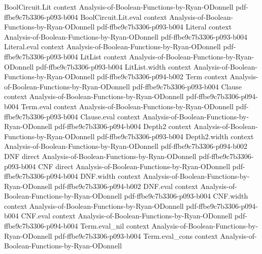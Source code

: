 \begin{lemma}
\label{LMN.varWeight_compose_sum}
\leanok
{}
\proofstep
  {BoolCircuit.Lit}
  {context}
  {Analysis-of-Boolean-Functions-by-Ryan-ODonnell}
  {pdf-ffbe9c7b3306-p093-b004}
\proofstep
  {BoolCircuit.Lit.eval}
  {context}
  {Analysis-of-Boolean-Functions-by-Ryan-ODonnell}
  {pdf-ffbe9c7b3306-p093-b004}
\proofstep
  {Literal}
  {context}
  {Analysis-of-Boolean-Functions-by-Ryan-ODonnell}
  {pdf-ffbe9c7b3306-p093-b004}
\proofstep
  {Literal.eval}
  {context}
  {Analysis-of-Boolean-Functions-by-Ryan-ODonnell}
  {pdf-ffbe9c7b3306-p093-b004}
\proofstep
  {LitList}
  {context}
  {Analysis-of-Boolean-Functions-by-Ryan-ODonnell}
  {pdf-ffbe9c7b3306-p093-b004}
\proofstep
  {LitList.width}
  {context}
  {Analysis-of-Boolean-Functions-by-Ryan-ODonnell}
  {pdf-ffbe9c7b3306-p094-b002}
\proofstep
  {Term}
  {context}
  {Analysis-of-Boolean-Functions-by-Ryan-ODonnell}
  {pdf-ffbe9c7b3306-p093-b004}
\proofstep
  {Clause}
  {context}
  {Analysis-of-Boolean-Functions-by-Ryan-ODonnell}
  {pdf-ffbe9c7b3306-p094-b004}
\proofstep
  {Term.eval}
  {context}
  {Analysis-of-Boolean-Functions-by-Ryan-ODonnell}
  {pdf-ffbe9c7b3306-p093-b004}
\proofstep
  {Clause.eval}
  {context}
  {Analysis-of-Boolean-Functions-by-Ryan-ODonnell}
  {pdf-ffbe9c7b3306-p094-b004}
\proofstep
  {Depth2}
  {context}
  {Analysis-of-Boolean-Functions-by-Ryan-ODonnell}
  {pdf-ffbe9c7b3306-p093-b004}
\proofstep
  {Depth2.width}
  {context}
  {Analysis-of-Boolean-Functions-by-Ryan-ODonnell}
  {pdf-ffbe9c7b3306-p094-b002}
\proofstep
  {DNF}
  {direct}
  {Analysis-of-Boolean-Functions-by-Ryan-ODonnell}
  {pdf-ffbe9c7b3306-p093-b004}
\proofstep
  {CNF}
  {direct}
  {Analysis-of-Boolean-Functions-by-Ryan-ODonnell}
  {pdf-ffbe9c7b3306-p094-b004}
\proofstep
  {DNF.width}
  {context}
  {Analysis-of-Boolean-Functions-by-Ryan-ODonnell}
  {pdf-ffbe9c7b3306-p094-b002}
\proofstep
  {DNF.eval}
  {context}
  {Analysis-of-Boolean-Functions-by-Ryan-ODonnell}
  {pdf-ffbe9c7b3306-p093-b004}
\proofstep
  {CNF.width}
  {context}
  {Analysis-of-Boolean-Functions-by-Ryan-ODonnell}
  {pdf-ffbe9c7b3306-p094-b004}
\proofstep
  {CNF.eval}
  {context}
  {Analysis-of-Boolean-Functions-by-Ryan-ODonnell}
  {pdf-ffbe9c7b3306-p094-b004}
\proofstep
  {Term.eval_nil}
  {context}
  {Analysis-of-Boolean-Functions-by-Ryan-ODonnell}
  {pdf-ffbe9c7b3306-p093-b004}
\proofstep
  {Term.eval_cons}
  {context}
  {Analysis-of-Boolean-Functions-by-Ryan-ODonnell}

\end{lemma}
